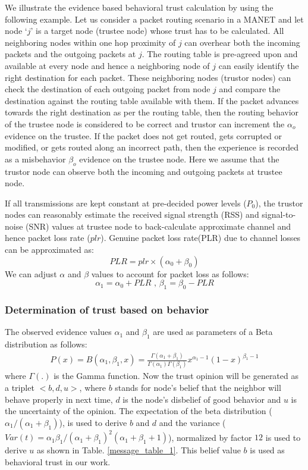 \documentclass[conference]{IEEEtran}
\begin{document}
We illustrate the evidence based behavioral trust calculation by using the following example.
Let us consider a packet routing scenario in a MANET and let node `$j$' is a target node (trustee node) whose trust has to be calculated. All neighboring nodes within one hop proximity of $j$ can overhear both the incoming packets and the outgoing packets at $j$. The routing table is pre-agreed upon and available at every node and hence a neighboring node of $j$ can easily identify the right destination for each packet. These neighboring nodes (trustor nodes) can check the destination of each outgoing packet from node $j$ and compare the destination against the routing table available with them. If the packet advances towards the right destination as per the routing table, then the routing behavior of the trustee node is considered to be correct and trustor can increment the $\alpha_o$ evidence on the trustee. If the packet does not get routed, gets corrupted or modified, or gets routed along an incorrect path, then the experience is recorded as a misbehavior $\beta_o$ evidence on the trustee node. Here we assume that the trustor node can observe both the incoming and outgoing packets at trustee node.

If all transmissions are kept constant at pre-decided power levels ($P_0$), the trustor nodes can reasonably estimate the received signal strength (RSS) and signal-to-noise (SNR) values at trustee node to back-calculate approximate channel and hence packet loss rate ($plr$). Genuine packet loss rate(PLR) due to channel losses can be approximated as:
\[PLR= plr \times (\alpha_0 + \beta_0)\]
We can adjust $\alpha$ and $\beta$ values to account for packet loss as follows:
\[\alpha_1=\alpha_0 + PLR \textrm{    ,  } \beta_1=\beta_0 - PLR\]




\subsubsection*{Determination of trust based on behavior}
The observed evidence values $\alpha_1$ and $\beta_1$ are used as parameters of a Beta distribution as follows:
\begin{eqnarray}
P(x)=B(\alpha_1, \beta_1, x)=\frac{\Gamma(\alpha_1+\beta_1)}{\Gamma(\alpha_1)\Gamma(\beta_1)}x^{\alpha_1-1}(1-x)^{\beta_1-1}
\label{beta_eqn}
\end{eqnarray}
where $\Gamma(.)$ is the Gamma function. Now the trust opinion will be generated as a triplet $<b, d, u>$, where $b$ stands for node's belief that the neighbor will behave properly in next time, $d$ is the node's disbelief of good behavior and $u$ is the uncertainty of the opinion. The expectation of the beta distribution ( $\alpha_1/(\alpha_1+\beta_1)$), is used to derive $b$ and $d$ and the variance ($Var(t)=\alpha_1\beta_1/(\alpha_1+\beta_1)^2(\alpha_1+\beta_1+1)$), normalized by factor $12$ is used to derive $u$ as shown in Table. \ref{message_table_1}. This belief value $b$ is used as behavioral trust in our work.
\end{document}
